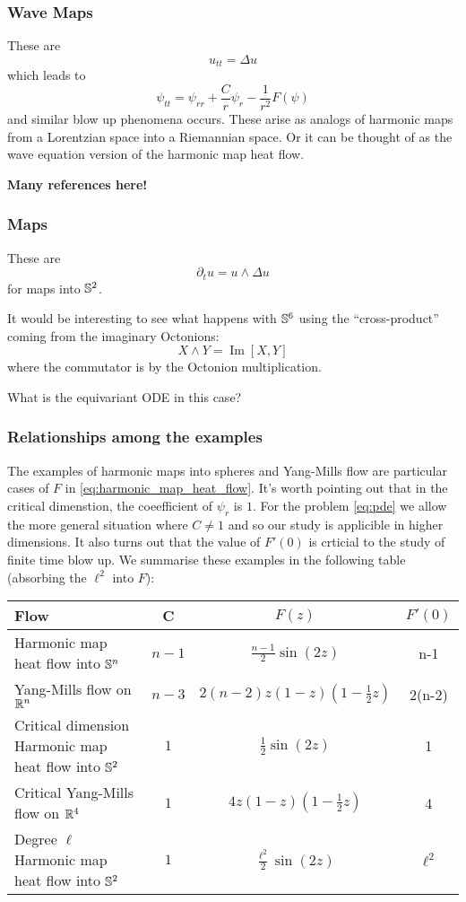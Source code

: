 \documentclass{amsart}
\begin{document}
\subsubsection*{Wave Maps}

These are
\[
u_{tt} = \Delta u
\]
which leads to
\[
\psi_{tt} = \psi_{rr} + \frac{C}{r} \psi_r - \frac{1}{r^2} F(\psi)
\]
and similar blow up phenomena occurs. These arise as analogs of harmonic maps from a Lorentzian space into a Riemannian space. Or it can be thought of as the wave equation version of the harmonic map heat flow.

\textbf{Many references here!}

\subsubsection*{\schrodinger{} Maps}

These are
\[
\partial_t u = u \wedge \Delta u
\]
for maps into \(\S^2\).

It would be interesting to see what happens with \(\S^6\) using the ``cross-product'' coming from the imaginary Octonions:
\[
X \wedge Y = \operatorname{Im} [X, Y]
\]
where the commutator is by the Octonion multiplication.

What is the equivariant ODE in this case?

\subsubsection*{Relationships among the examples}

The examples of harmonic maps into spheres and Yang-Mills flow are particular cases of \(F\) in \eqref{eq:harmonic_map_heat_flow}. It's worth pointing out that in the critical dimenstion, the coeefficient of \(\psi_r\) is \(1\). For the problem \eqref{eq:pde} we allow the more general situation where \(C \ne 1\) and so our study is applicible in higher dimensions. It also turns out that the value of \(F'(0)\) is crticial to the study of finite time blow up. We summarise these examples in the following table (absorbing the \(\ell^2\) into \(F\)):

\begin{center}
\begin{tabular}{ l | c | c | c}
Flow & C & \(F(z)\) & \(F'(0)\) \\
\hline
Harmonic map heat flow into \(\S^n\) & \(n-1\) & \(\tfrac{n-1}{2} \sin(2z)\) & n-1 \\
Yang-Mills flow on \(\R^n\) & \(n-3\) & \(2(n-2) z(1 - z)(1 - \tfrac{1}{2} z)\) & 2(n-2) \\
Critical dimension Harmonic map heat flow into \(\S^2\) & \(1\) & \(\tfrac{1}{2} \sin(2z)\) & 1 \\
Critical Yang-Mills flow on \(\R^4\) & \(1\) & \(4 z(1 - z)(1 - \tfrac{1}{2} z)\) & 4 \\
Degree \(\ell\) Harmonic map heat flow into \(\S^2\) & \(1\) & \(\tfrac{\ell^2}{2} \sin(2z)\) & \(\ell^2\)
\end{tabular}
\end{center}
\end{document}
